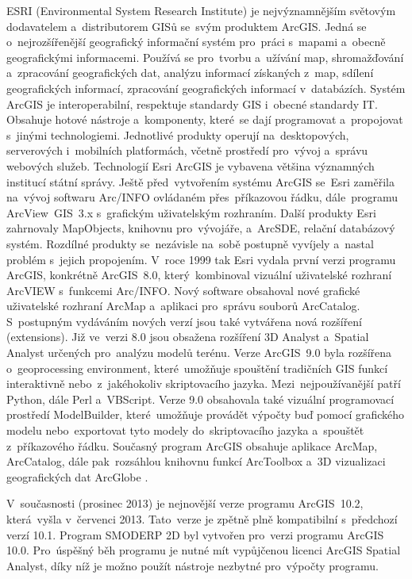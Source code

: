 ESRI (Environmental System Research Institute) je nejvýznamnějším světovým dodavatelem a~distributorem GISů se~svým produktem ArcGIS. Jedná se o~nejrozšířenější geografický informační systém pro~práci s~mapami a~obecně geografickými informacemi. 
Používá se pro~tvorbu a~užívání map, shromažďování a~zpracování geografických dat, analýzu informací získaných z~map, sdílení geografických informací, zpracování geografických informací v~databázích. Systém ArcGIS je interoperabilní, respektuje standardy GIS i~obecné standardy IT.
Obsahuje hotové nástroje a~komponenty, které~se dají programovat a~propojovat s~jinými technologiemi. Jednotlivé produkty operují na~desktopových, serverových i~mobilních platformách, včetně prostředí pro~vývoj a~správu webových služeb. 
Technologií Esri ArcGIS je vybavena většina významných institucí státní správy. Ještě před~vytvořením systému ArcGIS se~Esri zaměřila na~vývoj softwaru Arc/INFO ovládaném přes~příkazovou řádku, dále~programu ArcView~GIS~3.x s~grafickým uživatelským rozhraním.
Další produkty Esri zahrnovaly MapObjects, knihovnu pro~vývojáře, a~ArcSDE, relační databázový systém. Rozdílné produkty se~nezávisle na~sobě postupně vyvíjely a~nastal problém s~jejich propojením. 
V~roce 1999 tak Esri vydala první verzi programu ArcGIS, konkrétně ArcGIS~8.0, který~kombinoval vizuální uživatelské rozhraní ArcVIEW s~funkcemi Arc/INFO. Nový software obsahoval nové grafické uživatelské rozhraní ArcMap a~aplikaci pro~správu souborů ArcCatalog. 
S~postupným vydáváním nových verzí jsou také vytvářena nová rozšíření (extensions). Již ve~verzi 8.0 jsou obsažena rozšíření 3D Analyst a~Spatial Analyst určených pro~analýzu modelů terénu. Verze ArcGIS~9.0 byla rozšířena o~geoprocessing environment, 
které~umožňuje spouštění tradičních GIS funkcí interaktivně nebo~z~jakéhokoliv skriptovacího jazyka. Mezi~nejpoužívanější patří Python, dále Perl a~VBScript. Verze 9.0 obsahovala také vizuální programovací prostředí ModelBuilder, 
které~umožňuje provádět výpočty buď pomocí grafického modelu nebo~exportovat tyto modely do~skriptovacího jazyka a~spouštět z~příkazového řádku. Současný program ArcGIS obsahuje aplikace ArcMap, ArcCatalog, dále pak~rozsáhlou knihovnu funkcí ArcToolbox a~3D vizualizaci geografických dat ArcGlobe \cite{nikola}. 

V~současnosti (prosinec 2013) je nejnovější verze programu ArcGIS~10.2, která~vyšla v~červenci 2013. Tato~verze je zpětně plně kompatibilní s~předchozí verzí 10.1. Program SMODERP 2D byl vytvořen pro~verzi programu ArcGIS 10.0. 
Pro~úspěšný běh programu je nutné mít vypůjčenou licenci ArcGIS Spatial Analyst, díky níž je možno použít nástroje nezbytné pro~výpočty programu.
